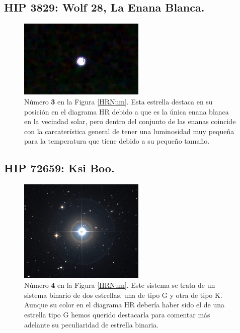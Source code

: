 \documentclass[a4paper]{article}
\begin{document}
		\subsection{HIP 3829: Wolf 28, La Enana Blanca.}
						\begin{figure}[H]
			\includegraphics[width=6cm]{Figures/HIP3829.png}
			
			\caption{N\'{u}mero \textbf{3} en la Figura \ref{HRNum}. Esta estrella destaca en su posici\'{o}n en el diagrama HR debido a que es la \'{u}nica enana blanca en la vecindad solar, pero dentro del conjunto de las enanas coincide con la carcater\'{i}stica general de tener una luminosidad muy pequeña para la temperatura que tiene debido a su peque\~{n}o tama\~{n}o.}
		\end{figure}

		\subsection{HIP 72659: Ksi Boo.}
								\begin{figure}[H]
			\includegraphics[trim={0 2cm 0 2cm},clip,width=6cm]{Figures/HIP72659.png}
			
			\caption{N\'{u}mero \textbf{4} en la Figura \ref{HRNum}. Este sistema se trata de un sistema binario de dos estrellas, una de tipo G y otra de tipo K. Aunque su color en el diagrama HR deber\'{i}a haber sido el de una estrella tipo G hemos querido destacarla para comentar m\'{a}s adelante su peculiaridad de estrella binaria.}
		\end{figure}

		



%
%
\end{document}

